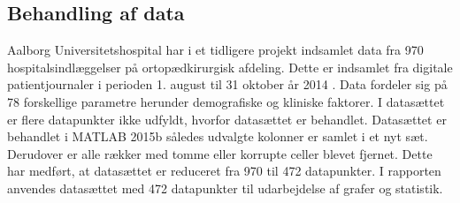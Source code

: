 \subsection*{Behandling af data}
Aalborg Universitetshospital har i et tidligere projekt indsamlet data fra 970 hospitalsindlæggelser på ortopædkirurgisk afdeling. Dette er indsamlet fra digitale patientjournaler i perioden 1. august til 31 oktober år 2014 . Data fordeler sig på 78 forskellige parametre herunder demografiske og kliniske faktorer. I datasættet er flere datapunkter ikke udfyldt, hvorfor datasættet er behandlet. 
Datasættet er behandlet i MATLAB 2015b således udvalgte kolonner er samlet i et nyt sæt. Derudover er alle rækker med tomme eller korrupte celler blevet fjernet. Dette har medført, at datasættet er reduceret fra 970 til 472 datapunkter. I rapporten anvendes datasættet med 472 datapunkter til udarbejdelse af grafer og statistik. 
 




